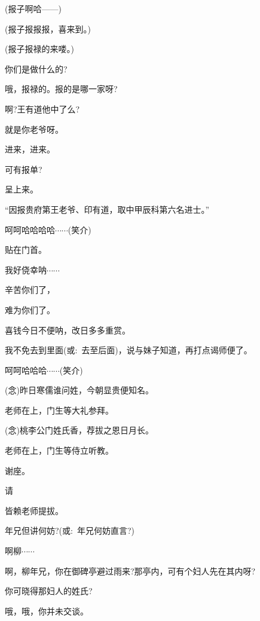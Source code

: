 {{(报子\hspace{30pt}啊哈------)}

{(报子\hspace{30pt}报报报，喜来到。)}

{(报子\hspace{30pt}报禄的来喽。)}

{你们是做什么的?}

{哦，报禄的。报的是哪一家呀?}

{啊?王有道他中了么?}

{就是你老爷呀。}

{进来，进来。}

{可有报单?}

{呈上来。}

{``因报贵府第王老爷、印有道，取中甲辰科第六名进士。''}

{呵呵哈哈哈哈$\cdots{}\cdots{}$({\hwfs 笑介})}

{贴在门首。}

{我好侥幸{\footnotesize 呐}$\cdots{}\cdots{}$}

{辛苦你们了，}

{难为你们了。}

{喜钱今日不便呐，改日多多重赏。}

{我不免去到里面({\akai 或}:~去至后面)，说与妹子知道，再打点谒师便了。}


{呵呵哈哈哈$\cdots{}\cdots{}$({\hwfs 笑介})}

{\vspace{5pt}}

{({\akai 念})昨日寒儒谁问姓，今朝显贵便知名。}

{老师在上，门生等大礼参拜。}

{({\akai 念})桃李公门姓氏香，荐拔之恩日月长。}

{老师在上，门生等侍立听教。}

{谢座。}

{请}

{皆赖老师提拔。}

{年兄但讲何妨?({\akai 或}:~年兄何妨直言?)}

{啊柳$\cdots{}\cdots{}$}

{啊，柳年兄，你在御碑亭避过雨来?那亭内，可有个妇人先在其内呀?}

{你可晓得那妇人的姓氏?}

{哦，哦，你并未交谈。}

}
